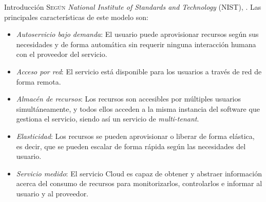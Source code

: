 \begin{chapter}{Introducción}
\label{chap:introducion}
\lettrine{S}{egún} \textit{National Institute of Standards and Technology} (NIST), \cite{computing}. Las principales características de este modelo son\label{nist}:
\begin{itemize}
    \item \emph{Autoservicio bajo demanda}: El usuario puede aprovisionar recursos según sus necesidades y de forma automática sin requerir ninguna interacción humana con el proveedor del servicio.
    \item \emph{Acceso por red}: El servicio está disponible para los usuarios a través de red de forma remota.
    \item \emph{Almacén de recursos}: Los recursos son accesibles por múltiples usuarios simultáneamente, y todos ellos acceden a la misma instancia del software que gestiona el servicio, siendo así un servicio de \textit{multi-tenant}.
    \item \emph{Elasticidad}: Los recursos se pueden aprovisionar o liberar de forma elástica, es decir, que se pueden escalar de forma rápida según las necesidades del usuario.
    \item \emph{Servicio medido}: El servicio Cloud es capaz de obtener y abstraer información acerca del consumo de recursos para monitorizarlos, controlarlos e informar al usuario y al proveedor.
\end{itemize}


\end{chapter}
